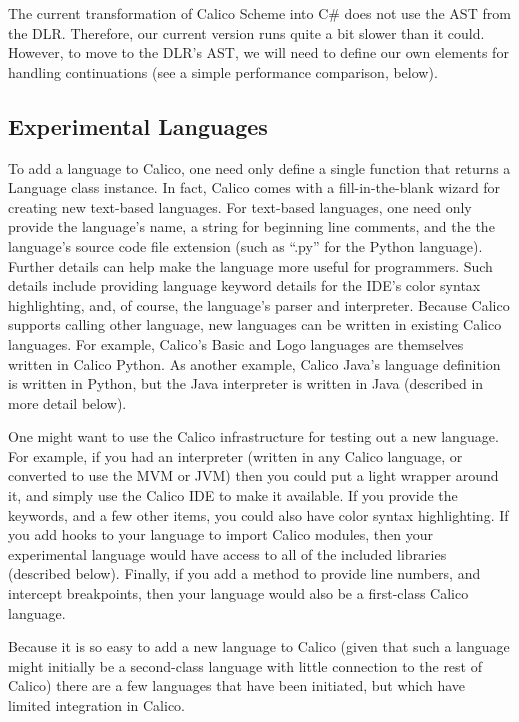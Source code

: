 \documentclass[preprint]{sigplanconf}
\begin{document}
The current transformation of Calico Scheme into C\# does not use the
AST from the DLR. Therefore, our current version runs quite a bit
slower than it could. However, to move to the DLR's AST, we will need
to define our own elements for handling continuations (see a
simple performance comparison, below). 


\subsection{Experimental Languages}

To add a language to Calico, one need only define a single function
that returns a Language class instance. In fact, Calico comes with a
fill-in-the-blank wizard for creating new text-based languages. For
text-based languages, one need only provide the language's name, a
string for beginning line comments, and the the language's source code
file extension (such as ``.py'' for the Python language). Further
details can help make the language more useful for programmers. Such
details include providing language keyword details for the IDE's color
syntax highlighting, and, of course, the language's parser and
interpreter. Because Calico supports calling other language, new
languages can be written in existing Calico languages. For example,
Calico's Basic and Logo languages are themselves written in Calico
Python. As another example, Calico Java's language definition is
written in Python, but the Java interpreter is written in Java
(described in more detail below).

One might want to use the Calico infrastructure for testing out a new
language. For example, if you had an interpreter (written in any
Calico language, or converted to use the MVM or JVM) then you could
put a light wrapper around it, and simply use the Calico IDE to make
it available. If you provide the keywords, and a few other items, you
could also have color syntax highlighting. If you add hooks to your
language to import Calico modules, then your experimental language
would have access to all of the included libraries (described
below). Finally, if you add a method to provide line numbers, and
intercept breakpoints, then your language would also be a first-class
Calico language.

Because it is so easy to add a new language to Calico (given that such
a language might initially be a second-class language with little
connection to the rest of Calico) there are a few languages that have
been initiated, but which have limited integration in Calico.
\end{document}
